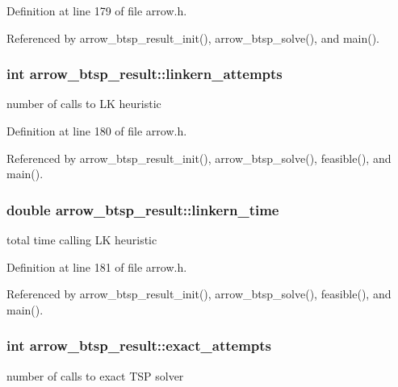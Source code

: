 Definition at line 179 of file arrow.h.

Referenced by arrow\_\-btsp\_\-result\_\-init(), arrow\_\-btsp\_\-solve(), and main().\hypertarget{structarrow__btsp__result_53b6e6b7922eb5c3e5a1b135d42d5654}{
\subsubsection{\setlength{\rightskip}{0pt plus 5cm}int {\bf arrow\_\-btsp\_\-result::linkern\_\-attempts}}}
\label{structarrow__btsp__result_53b6e6b7922eb5c3e5a1b135d42d5654}


number of calls to LK heuristic 

Definition at line 180 of file arrow.h.

Referenced by arrow\_\-btsp\_\-result\_\-init(), arrow\_\-btsp\_\-solve(), feasible(), and main().\hypertarget{structarrow__btsp__result_7e8a3ff6f55c89caa52a7a793fa36dd6}{
\subsubsection{\setlength{\rightskip}{0pt plus 5cm}double {\bf arrow\_\-btsp\_\-result::linkern\_\-time}}}
\label{structarrow__btsp__result_7e8a3ff6f55c89caa52a7a793fa36dd6}


total time calling LK heuristic 

Definition at line 181 of file arrow.h.

Referenced by arrow\_\-btsp\_\-result\_\-init(), arrow\_\-btsp\_\-solve(), feasible(), and main().\hypertarget{structarrow__btsp__result_47433b850b6addae44522177a50696b3}{
\subsubsection{\setlength{\rightskip}{0pt plus 5cm}int {\bf arrow\_\-btsp\_\-result::exact\_\-attempts}}}
\label{structarrow__btsp__result_47433b850b6addae44522177a50696b3}


number of calls to exact TSP solver 

